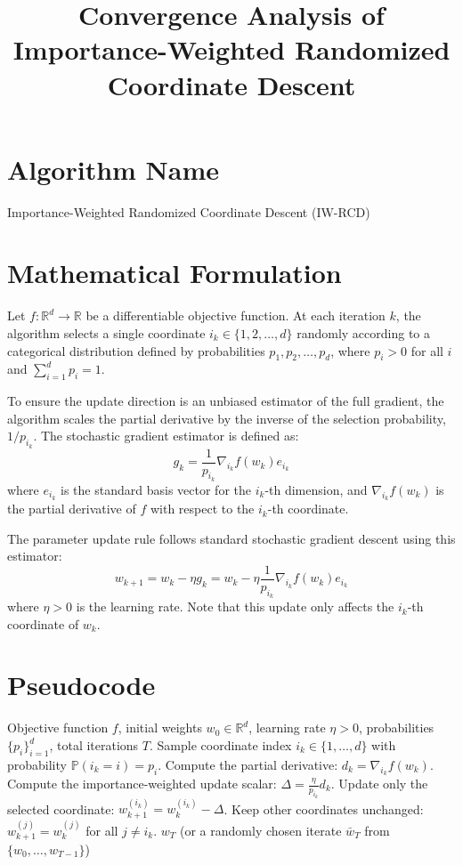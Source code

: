 \documentclass{article}
\title{Convergence Analysis of Importance-Weighted Randomized Coordinate Descent}
\author{}
\date{}
\begin{document}
\maketitle

\section*{Algorithm Name}
Importance-Weighted Randomized Coordinate Descent (IW-RCD)

\section*{Mathematical Formulation}
Let $f: \mathbb{R}^d \to \mathbb{R}$ be a differentiable objective function. At each iteration $k$, the algorithm selects a single coordinate $i_k \in \{1, 2, \dots, d\}$ randomly according to a categorical distribution defined by probabilities $p_1, p_2, \dots, p_d$, where $p_i > 0$ for all $i$ and $\sum_{i=1}^d p_i = 1$.

To ensure the update direction is an unbiased estimator of the full gradient, the algorithm scales the partial derivative by the inverse of the selection probability, $1/p_{i_k}$. The stochastic gradient estimator is defined as:
\begin{equation}
    g_k = \frac{1}{p_{i_k}} \nabla_{i_k} f(w_k) e_{i_k}
\end{equation}
where $e_{i_k}$ is the standard basis vector for the $i_k$-th dimension, and $\nabla_{i_k} f(w_k)$ is the partial derivative of $f$ with respect to the $i_k$-th coordinate.

The parameter update rule follows standard stochastic gradient descent using this estimator:
\begin{equation}
    w_{k+1} = w_k - \eta g_k = w_k - \eta \frac{1}{p_{i_k}} \nabla_{i_k} f(w_k) e_{i_k}
\end{equation}
where $\eta > 0$ is the learning rate. Note that this update only affects the $i_k$-th coordinate of $w_k$.

\section*{Pseudocode}
\begin{algorithm}[H]
\caption{Importance-Weighted Randomized Coordinate Descent}
\begin{algorithmic}[1]
\REQUIRE Objective function $f$, initial weights $w_0 \in \mathbb{R}^d$, learning rate $\eta > 0$, probabilities $\{p_i\}_{i=1}^d$, total iterations $T$.
    \STATE Sample coordinate index $i_k \in \{1, \dots, d\}$ with probability $\mathbb{P}(i_k = i) = p_i$.
    \STATE Compute the partial derivative: $d_k = \nabla_{i_k} f(w_k)$.
    \STATE Compute the importance-weighted update scalar: $\Delta = \frac{\eta}{p_{i_k}} d_k$.
    \STATE Update only the selected coordinate: $w_{k+1}^{(i_k)} = w_k^{(i_k)} - \Delta$.
    \STATE Keep other coordinates unchanged: $w_{k+1}^{(j)} = w_k^{(j)}$ for all $j \neq i_k$.
\ENDFOR
\RETURN $w_T$ (or a randomly chosen iterate $\bar{w}_T$ from $\{w_0, \dots, w_{T-1}\}$)
\end{algorithmic}
\end{algorithm}
\end{document}
